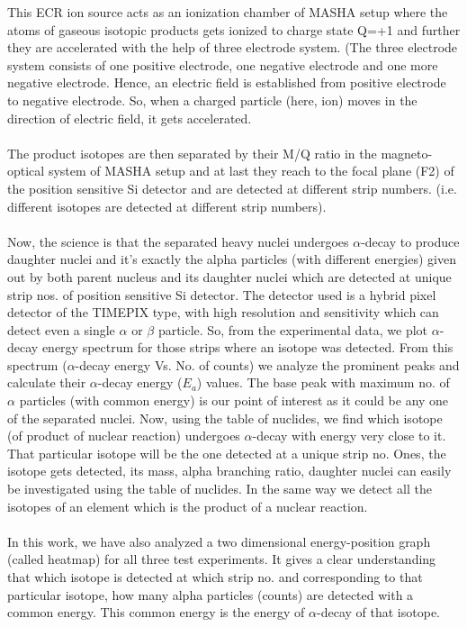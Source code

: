 \documentclass[12pt]{article}
\begin{document}
This ECR ion source acts as an ionization chamber of MASHA setup where the atoms of gaseous isotopic products gets ionized to charge state Q=+1 and further they are accelerated with the help of three electrode system. (The three electrode system consists of one positive electrode, one negative electrode and one more negative electrode. Hence, an electric field is established from positive electrode to negative electrode. So, when a charged particle (here, ion) moves in the direction of electric field, it gets accelerated.\\
\\
The product isotopes are then separated by their M/Q ratio in the magneto-optical system of MASHA setup and at last they reach to the focal plane (F2) of the position sensitive Si detector and are detected at different strip numbers. (i.e. different isotopes are detected at different strip numbers).\\
\\
Now, the science is that the separated heavy nuclei undergoes
$\alpha$-decay to produce daughter nuclei and it's exactly the alpha particles (with different energies) given out by both parent nucleus and its daughter nuclei which are detected at unique strip nos. of position sensitive Si detector. The detector used is a hybrid pixel detector of the TIMEPIX type, with high resolution and sensitivity which can detect even a single $\alpha$ or $\beta$ particle. So, from the experimental data, we plot $\alpha$-decay energy spectrum for those strips where an isotope was detected. From this spectrum ($\alpha$-decay energy Vs. No. of counts) we analyze the prominent peaks and calculate their $\alpha$-decay energy ($E_a$) values. The base peak with maximum no. of $\alpha$ particles (with common energy) is our point of interest as it could be any one of the separated nuclei. Now, using the table of nuclides, we find which isotope (of product of nuclear reaction) undergoes $\alpha$-decay with energy very close to it. That particular isotope will be the one detected at a unique strip no. Ones, the isotope gets detected, its mass, alpha branching ratio, daughter nuclei can easily be investigated using the table of nuclides. In the same way we detect all the isotopes of an element which is the product of a nuclear reaction.\\
\\
In this work, we have also analyzed a two dimensional energy-position graph (called heatmap) for all three test experiments. It gives a clear understanding that which isotope is detected at which strip no. and corresponding to that particular isotope, how many alpha particles (counts) are detected with a common energy. This common energy is the energy of $\alpha$-decay of that isotope.
\end{document}
